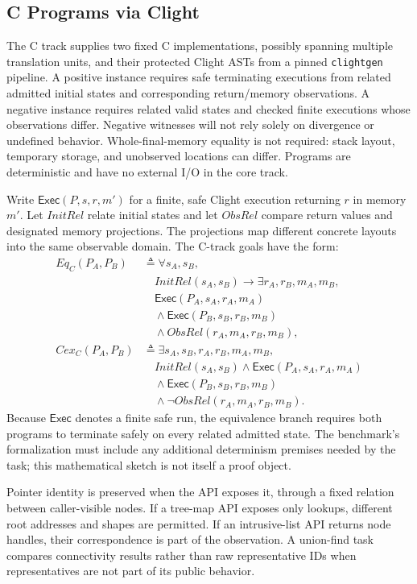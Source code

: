 \documentclass{article}
\begin{document}
\subsection{C Programs via Clight}

The C track supplies two fixed C implementations, possibly spanning multiple translation units, and their protected Clight ASTs from a pinned \texttt{clightgen} pipeline. A positive instance requires safe terminating executions from related admitted initial states and corresponding return/memory observations. A negative instance requires related valid states and checked finite executions whose observations differ. Negative witnesses will not rely solely on divergence or undefined behavior. Whole-final-memory equality is not required: stack layout, temporary storage, and unobserved locations can differ. Programs are deterministic and have no external I/O in the core track.

Write $\mathsf{Exec}(P,s,r,m')$ for a finite, safe Clight execution returning $r$ in memory $m'$. Let $\mathit{InitRel}$ relate initial states and let $\mathit{ObsRel}$ compare return values and designated memory projections. The projections map different concrete layouts into the same observable domain. The C-track goals have the form:
\begin{align}
  \mathit{Eq}_C(P_A,P_B) &\triangleq \forall s_A,s_B,\\
  &\quad \mathit{InitRel}(s_A,s_B) \rightarrow \exists r_A,r_B,m_A,m_B,\\
  &\quad \mathsf{Exec}(P_A,s_A,r_A,m_A) \\
  &\quad \land \mathsf{Exec}(P_B,s_B,r_B,m_B) \\
  &\quad \land \mathit{ObsRel}(r_A,m_A,r_B,m_B),\\
  \mathit{Cex}_C(P_A,P_B) &\triangleq \exists s_A,s_B,r_A,r_B,m_A,m_B,\\
  &\quad \mathit{InitRel}(s_A,s_B) \land \mathsf{Exec}(P_A,s_A,r_A,m_A) \\
  &\quad \land \mathsf{Exec}(P_B,s_B,r_B,m_B) \\
  &\quad \land \neg\mathit{ObsRel}(r_A,m_A,r_B,m_B).
\end{align}
Because $\mathsf{Exec}$ denotes a finite safe run, the equivalence branch requires both programs to terminate safely on every related admitted state. The benchmark's formalization must include any additional determinism premises needed by the task; this mathematical sketch is not itself a proof object.

Pointer identity is preserved when the API exposes it, through a fixed relation between caller-visible nodes. If a tree-map API exposes only lookups, different root addresses and shapes are permitted. If an intrusive-list API returns node handles, their correspondence is part of the observation. A union-find task compares connectivity results rather than raw representative IDs when representatives are not part of its public behavior.
\end{document}
